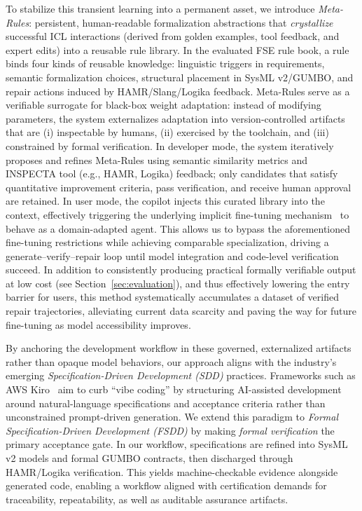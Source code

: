 \documentclass[conference]{IEEEtran}
\begin{document}
To stabilize this transient learning into a permanent asset, we introduce \textit{Meta-Rules}: persistent, human-readable formalization abstractions that \emph{crystallize} successful ICL interactions (derived from golden examples, tool feedback, and expert edits) into a reusable rule library. In the evaluated FSE rule book, a rule binds four kinds of reusable knowledge: linguistic triggers in requirements, semantic formalization choices, structural placement in SysML v2/GUMBO, and repair actions induced by HAMR/Slang/Logika feedback. Meta-Rules serve as a verifiable surrogate for black-box weight adaptation: instead of modifying parameters, the system externalizes adaptation into version-controlled artifacts that are (i) inspectable by humans, (ii) exercised by the toolchain, and (iii) constrained by formal verification.
%
In developer mode, the system iteratively proposes and refines Meta-Rules using semantic similarity metrics and INSPECTA tool (e.g., HAMR, Logika) feedback; only candidates that satisfy quantitative improvement criteria, pass verification, and receive human approval are retained. In user mode, the copilot injects this curated library into the context, effectively triggering the underlying implicit fine-tuning mechanism~\cite{vonoswald2023transformers} to behave as a domain-adapted agent. This allows us to bypass the aforementioned fine-tuning restrictions while achieving comparable specialization, driving a generate--verify--repair loop until model integration and code-level verification succeed.
%
In addition to consistently producing practical formally verifiable output at low cost (see Section~\ref{sec:evaluation}), and thus effectively lowering the entry barrier for users, this method systematically accumulates a dataset of verified repair trajectories, alleviating current data scarcity and paving the way for future fine-tuning as model accessibility improves.

By anchoring the development workflow in these governed, externalized artifacts rather than opaque model behaviors, our approach aligns with the industry's emerging \textit{Specification-Driven Development (SDD)} practices. Frameworks such as AWS Kiro~\cite{amazon2024mathematical} aim to curb ``vibe coding'' by structuring AI-assisted development around natural-language specifications and acceptance criteria rather than unconstrained prompt-driven generation. We extend this paradigm to \textit{Formal Specification-Driven Development (FSDD)} by making \emph{formal verification} the primary acceptance gate. In our workflow, specifications are refined into SysML v2 models and formal GUMBO contracts, then discharged through HAMR/Logika verification. This yields machine-checkable evidence alongside generated code, enabling a workflow aligned with certification demands for traceability, repeatability, as well as auditable assurance artifacts.
\end{document}
